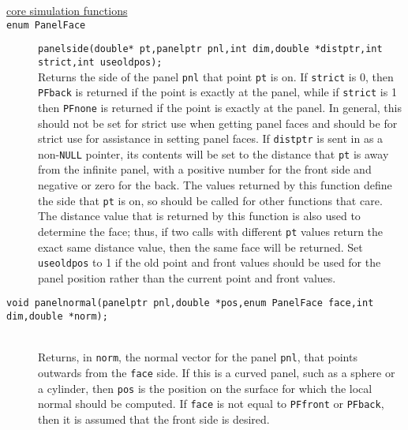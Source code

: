 \documentclass {book}
\begin{document}
\begin{description}
\item[\underline{core simulation functions}]

\item[\texttt{enum PanelFace}]
\texttt{panelside(double* pt,panelptr pnl,int dim,double *distptr,int strict,int useoldpos);}
\hfill \\
Returns the side of the panel \texttt{pnl} that point \texttt{pt} is on. If \texttt{strict} is 0, then \texttt{PFback} is returned if the point is exactly at the panel, while if \texttt{strict} is 1 then \texttt{PFnone} is returned if the point is exactly at the panel. In general, this should not be set for strict use when getting panel faces and should be for strict use for assistance in setting panel faces. If \texttt{distptr} is sent in as a non-\texttt{NULL} pointer, its contents will be set to the distance that \texttt{pt} is away from the infinite panel, with a positive number for the front side and negative or zero for the back. The values returned by this function define the side that \texttt{pt} is on, so should be called for other functions that care. The distance value that is returned by this function is also used to determine the face; thus, if two calls with different \texttt{pt} values return the exact same distance value, then the same face will be returned. Set \texttt{useoldpos} to 1 if the old point and front values should be used for the panel position rather than the current point and front values.

\item[\texttt{void panelnormal(panelptr pnl,double *pos,enum PanelFace face,int dim,double *norm);}]
\hfill \\
Returns, in \texttt{norm}, the normal vector for the panel \texttt{pnl}, that points outwards from the \texttt{face} side. If this is a curved panel, such as a sphere or a cylinder, then \texttt{pos} is the position on the surface for which the local normal should be computed. If \texttt{face} is not equal to \texttt{PFfront} or \texttt{PFback}, then it is assumed that the front side is desired.


\end{description}
\end{document}
